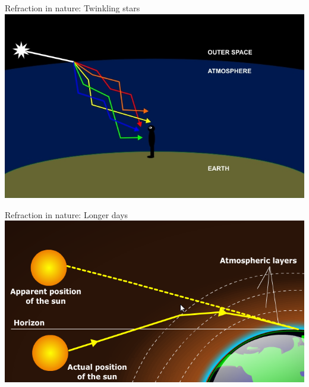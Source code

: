 \begin{frame}{Refraction in nature: Twinkling stars}
  \includegraphics[width=\textwidth]{media/twinkle.jpg}
\end{frame}
\begin{frame}{Refraction in nature: Longer days}
  \includegraphics[width=\textwidth]{media/sunset.png}
\end{frame}

